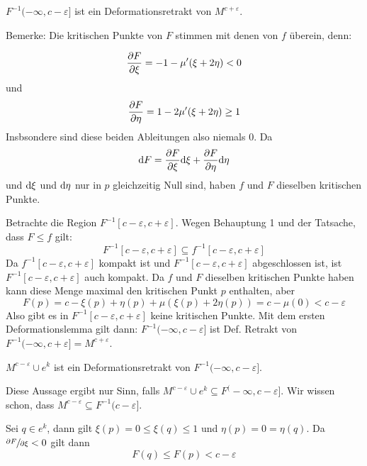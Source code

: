 \begin{bigproof}
    \begin{claim} 
        $F^{-1}(-\infty, c - \varepsilon]$ ist ein
        Deformationsretrakt von $M^{c + \varepsilon}$.
    \end{claim}

    \begin{smallproof}
        Bemerke: Die kritischen Punkte von $F$ stimmen mit denen von $f$ überein, 
        denn:

        \[ \pderive[F]{\xi} = -1 - \mu'(\xi + 2\eta)  < 0 \]
        und
        \[ \pderive[F]{\eta} = 1 - 2 \mu'(\xi + 2\eta) \geq 1 \]
        Insbsondere sind diese beiden Ableitungen also niemals $0$. Da 
        \[ \opd F = \pderive[F]{\xi}\opd \xi + \pderive[F]{\eta} \opd \eta \]
        und ${ \operatorname{d} } \xi$ und ${ \operatorname{d} } \eta$ nur in $p$ gleichzeitig Null sind, haben $f$ 
        und $F$  dieselben kritischen Punkte.

        Betrachte die Region $F^{-1}[c - \varepsilon, c + \varepsilon]$. Wegen 
        Behauptung 1 und der Tatsache, dass $F \leq f$ gilt:
        \[ F^{-1}[c - \varepsilon, c + \varepsilon] \subseteq f^{-1}[c - \varepsilon, c + \varepsilon] \]
        Da $f^{-1}[c - \varepsilon, c + \varepsilon]$ kompakt ist und 
        $F^{-1}[c - \varepsilon, c + \varepsilon]$ abgeschlossen ist, ist 
        $F^{-1}[c - \varepsilon, c + \varepsilon]$ auch kompakt. Da $f$ und $F$
        dieselben kritischen Punkte haben kann diese Menge maximal den kritischen 
        Punkt $p$ enthalten, aber
        \[ F(p) = c - \xi(p) + \eta(p) + \mu(\xi(p) + 2\eta(p)) = c - \mu(0) < c - \varepsilon \]
        Also gibt es in $F^{-1}[c - \varepsilon, c + \varepsilon]$ keine kritischen
        Punkte. Mit dem ersten Deformationslemma gilt dann:
        $F^{-1}(- \infty, c - \varepsilon]$ ist Def. Retrakt von 
        $F^{-1}(-\infty, c + \varepsilon] = M^{c + \varepsilon}$.
    \end{smallproof}

    \begin{claim}
        $M^{c - \varepsilon} \cup e^{k}$ ist ein 
        Deformationsretrakt von $F^{-1}(-\infty, c - \varepsilon]$.
    \end{claim}

    \begin{smallproof}
        Diese Aussage ergibt nur Sinn, falls 
        $M^{c - \varepsilon} \cup e^{k} \subseteq F^(-\infty, c - \varepsilon]$.
        Wir wissen schon, dass $M^{c - \varepsilon} \subseteq F^{-1}(c - \varepsilon]$.

        Sei $q \in e^k$, dann gilt $\xi(p) = 0 \leq \xi(q) \leq 1$ und 
        $\eta(p) = 0 = \eta(q)$. Da 
        $\pderive[F]{\xi} < 0$ gilt dann
        \[ F(q) \leq F(p) < c - \varepsilon \]


\end{smallproof}
\end{bigproof}
